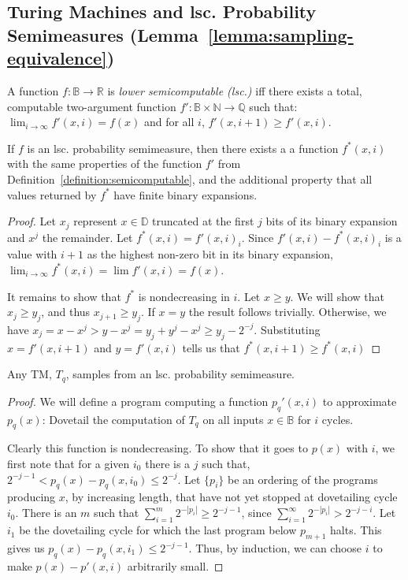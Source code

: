 \subsection{Turing Machines and lsc. Probability Semimeasures (Lemma~\ref{lemma:sampling-equivalence})} 
\begin{definition}
A function $f : {\mathbb B} \rightarrow {\mathbb R}$ is \emph{lower semicomputable (lsc.)} iff there exists a total, computable two-argument function $f': {\mathbb B} \times {\mathbb N} \rightarrow \mathbb Q$ such that: $\lim_{i \rightarrow \infty} f'(x, i) = f(x)$ and  for all $i$, $f'(x, i + 1) \geq f'(x, i)$.
\label{definition:semicomputable}
\end{definition}

\begin{lemma}
If $f$ is an lsc. probability semimeasure, then there exists a a function $f^*(x, i)$ with the same properties of the function $f'$ from Definition~\ref{definition:semicomputable}, and the additional property that all values returned by $f^*$ have finite binary expansions.
\label{lemma:f-star}
\end{lemma}
\begin{proof}
Let $x_j$ represent $x \in {\mathbb D}$ truncated at the first $j$ bits of its binary expansion and $x^j$ the remainder. Let $f^*(x, i) = f'(x, i)_i$. Since $f'(x, i) - f^*(x, i)_i$ is a value with $i+1$ as the highest non-zero bit in its binary expansion, $\lim_{i\rightarrow \infty} f^*(x, i) = \lim f'(x, i) = f(x)$.
 
It remains to show that $f^*$ is nondecreasing in $i$. Let $x \geq y$. We will show that $x_j \geq y_j$, and thus $x_{j+1} \geq y_j$. If $x = y$ the result follows trivially. Otherwise, we have $x_j = x - x^j > y - x^j = y_j + y ^j - x^j \geq y_j - 2^{-j}$. Substituting $x = f'(x, i+1)$ and $y = f'(x,i)$ tells us that $f^*(x, i+1) \geq f^*(x, i)$
\end{proof}

\begin{theorem}
Any TM, $T_q$, samples from an lsc. probability semimeasure.\label{theorem:back}
\end{theorem}
\begin{proof}
We will define a program computing a function $p_q'(x, i)$ to approximate $p_q(x)$: Dovetail the computation of $T_q$ on all inputs $x \in \mathbb B$ for $i$ cycles.

Clearly this function is nondecreasing. To show that it goes to $p(x)$ with $i$, we first note that for a given $i_0$ there is a $j$ such that, $2^{-j-1} < p_q(x) - p_q(x, i_0) \leq 2^{-j}$. Let $\{p_i\}$ be an ordering of the programs producing $x$, by increasing length, that have not yet stopped at dovetailing cycle $i_0$. There is an $m$ such that $\sum_{i=1}^m 2^{-|p_i|} \geq 2^{-j-1}$, since $\sum_{i=1}^{\infty}2^{-|p_i|} > 2^{-j-i}$. Let $i_1$ be the dovetailing cycle for which the last program below $p_{m+1}$ halts. This gives us $p_q(x) - p_q(x, i_1) \leq 2^{-j-1}$. Thus, by induction, we can choose $i$ to make $p(x) - p'(x, i)$ arbitrarily small. 
\end{proof}

